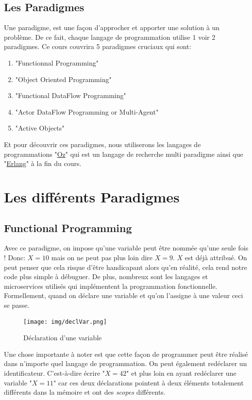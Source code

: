 \documentclass{report}
\begin{document}
\section{Les Paradigmes}
Une paradigme, est une façon d'approcher et apporter une solution à un problème. De ce fait, chaque langage de programmation utilise 1 voir 2 paradigmes. Ce cours couvrira 5 paradigmes cruciaux qui sont:
\begin{enumerate}
\item "Functionnal Programming"
\item "Object Oriented Programming"
\item "Functional DataFlow Programming"
\item "Actor DataFlow Programming or Multi-Agent"
\item "Active Objects"
\end{enumerate}

Et pour découvrir ces paradigmes, nous utiliserons les langages de programmations "\href{https://fr.wikipedia.org/wiki/Oz_(langage)}{Oz}" qui est un langage de recherche multi paradigme ainsi que "\href{https://fr.wikipedia.org/wiki/Erlang_(langage)}{Erlang}" à la fin du cours.

\chapter{Les différents Paradigmes}
\section{Functional Programming}
Avec ce paradigme, on impose qu'une variable peut être nommée qu'une seule fois ! Donc: $X = 10$ mais on ne peut pas plus loin dire $X = 9$. $X$ est déjà attribué. On peut penser que cela risque d'être handicapant alors qu'en réalité, cela rend notre code plus simple à débuguer. De plus, nombreux sont les langages et microservices utilisés qui implémentent la programmation fonctionnelle.
Formellement, quand on déclare une variable et qu'on l'assigne à une valeur ceci se passe.
\begin{figure}
	\centering
    \texttt{[image: img/declVar.png]}
    \caption{Déclaration d'une variable}
\end{figure}
Une chose importante à noter est que cette façon de programmer peut être réalisé dans n'importe quel langage de programmation. On peut également redéclarer un identificateur. C'est-à-dire écrire "$X = 42$" et plus loin en ayant redéclarer une variable "$X = 11$" car ces deux déclarations pointent à deux éléments totalement différents dans la mémoire et ont des \textit{scopes} différents.\\
\end{document}
